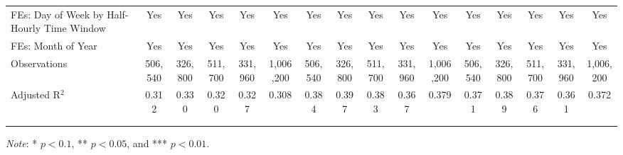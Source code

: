 {\begin{sidewaystable}[t!]
\begin{adjustbox}{scale = 0.65}
\begin{threeparttable}
\begin{tabular}{@{\extracolsep{2pt}}lccccccccccccccc}
                    FEs: Day of Week by Half-Hourly Time Window & Yes & Yes & Yes & Yes & Yes & Yes & Yes & Yes & Yes & Yes & Yes & Yes & Yes & Yes & Yes \\
                    FEs: Month of Year & Yes & Yes & Yes & Yes & Yes & Yes & Yes & Yes & Yes & Yes & Yes & Yes & Yes & Yes & Yes \\
                    Observations & 506,540 & 326,800 & 511,700 & 331,960 & 1,006,200 & 506,540 & 326,800 & 511,700 & 331,960 & 1,006,200 & 506,540 & 326,800 & 511,700 & 331,960 & 1,006,200 \\
                    Adjusted R$^{2}$ & 0.312 & 0.330 & 0.320 & 0.327 & 0.308 & 0.384 & 0.397 & 0.383 & 0.367 & 0.379 & 0.371 & 0.389 & 0.376 & 0.361 & 0.372 \\
                    \\[-2.0ex]
                    \hline \hline
                    \\[-4.5ex]
                \end{tabular}
                \begin{tablenotes}[flushleft]
                    \footnotesize
                    \item \textit{Note}: * $p < 0.1$, ** $p < 0.05$, and *** $p < 0.01$.
                \end{tablenotes}
            \end{threeparttable}
        \end{adjustbox}
    \end{sidewaystable}
}
